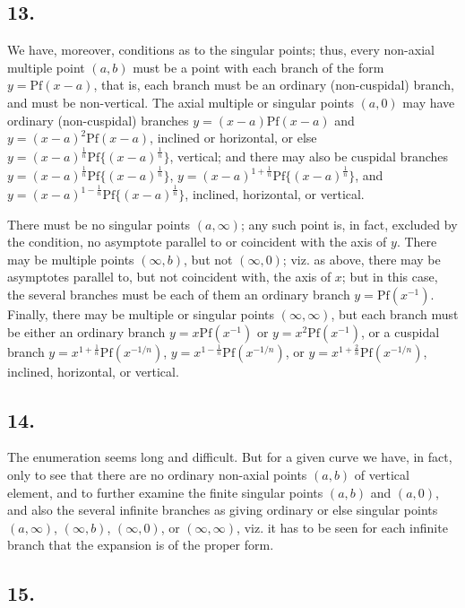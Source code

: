 \documentclass[11pt,a4paper]{book}
\providecommand{\Pf}{\mathrm{Pf}}
\begin{document}
\subsection*{13.}

We have, moreover, conditions as to the singular points; thus, every non-axial multiple point $(a, b)$ must be a point with each branch of the form $y = \Pf(x - a)$, that is, each branch must be an ordinary (non-cuspidal) branch, and must be non-vertical. The axial multiple or singular points $(a, 0)$ may have ordinary (non-cuspidal) branches $y = (x - a)\Pf(x - a)$ and $y = (x - a)^2\Pf(x - a)$, inclined or horizontal, or else $y = (x - a)^{\frac{1}{n}} \Pf\{(x - a)^{\frac{1}{n}}\}$, vertical; and there may also be cuspidal branches $y = (x - a)^{\frac{1}{n}} \Pf\{(x - a)^{\frac{1}{n}}\}$, $y = (x - a)^{1 + \frac{1}{n}} \Pf\{(x - a)^{\frac{1}{n}}\}$, and $y = (x - a)^{1 - \frac{1}{n}} \Pf\{(x - a)^{\frac{1}{n}}\}$, inclined, horizontal, or vertical.

There must be no singular points $(a, \infty)$; any such point is, in fact, excluded by the condition, no asymptote parallel to or coincident with the axis of $y$. There may be multiple points $(\infty, b)$, but not $(\infty, 0)$; viz. as above, there may be asymptotes parallel to, but not coincident with, the axis of $x$; but in this case, the several branches must be each of them an ordinary branch $y = \Pf(x^{-1})$. Finally, there may be multiple or singular points $(\infty, \infty)$, but each branch must be either an ordinary branch $y = x\Pf(x^{-1})$ or $y = x^2\Pf(x^{-1})$, or a cuspidal branch $y = x^{1 + \frac{1}{n}} \Pf(x^{-1/n})$, $y = x^{1 - \frac{1}{n}} \Pf(x^{-1/n})$, or $y = x^{1 + \frac{2}{n}} \Pf(x^{-1/n})$, inclined, horizontal, or vertical.

\subsection*{14.}

The enumeration seems long and difficult. But for a given curve we have, in fact, only to see that there are no ordinary non-axial points $(a, b)$ of vertical element, and to further examine the finite singular points $(a, b)$ and $(a, 0)$, and also the several infinite branches as giving ordinary or else singular points $(a, \infty)$, $(\infty, b)$, $(\infty, 0)$, or $(\infty, \infty)$, viz. it has to be seen for each infinite branch that the expansion is of the proper form.

\subsection*{15.}
\end{document}
